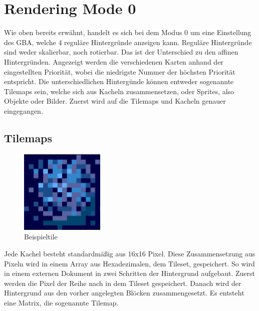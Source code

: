 \chapter{Rendering Mode 0}
Wie oben bereits erwähnt, handelt es sich bei dem Modus 0 um eine Einstellung des \ac{GBA}, welche 4 reguläre Hintergründe anzeigen kann. Reguläre Hintergründe sind weder skalierbar, noch rotierbar. Das ist der Unterschied zu den affinen Hintergründen. Angezeigt werden die verschiedenen Karten anhand der eingestellten Priorität, wobei die niedrigste Nummer der höchsten Priorität entspricht. Die unterschiedlichen Hintergünde können entweder sogenannte Tilemaps sein, welche sich aus Kacheln zusammensetzen, oder Sprites, also Objekte oder Bilder. Zuerst wird auf die Tilemaps und Kacheln genauer eingegangen. \citep{mode}
\section{Tilemaps}
\begin{figure}
	\includegraphics[height=40mm]{img/tile_blue.png}
	\caption{Beispieltile}
	\label{example_tile}
\end{figure}
Jede Kachel besteht standardmäßig aus 16x16 Pixel. Diese Zusammensetzung aus Pixeln wird in einem Array aus Hexadezimalen, dem Tileset, gespeichert. So wird in einem externen Dokument in zwei Schritten der Hintergrund aufgebaut. Zuerst werden die Pixel der Reihe nach in dem Tileset gespeichert. Danach wird der Hintergrund aus den vorher angelegten Blöcken zusammengesetzt. Es entsteht eine Matrix, die sogenannte Tilemap. 

